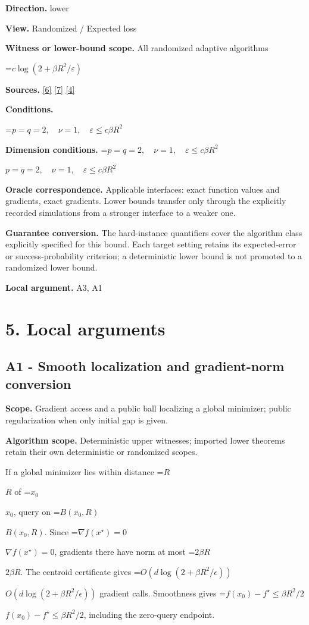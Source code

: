 \documentclass[10pt,a4paper]{article}
\newcommand{\AtlasMath}[1]{\par\begingroup\centering\setbox0=\hbox{$\displaystyle #1$}\ifdim\wd0>1.4\linewidth\typeout{ATLAS WIDE FORMULA: \the\wd0}\fi\ifdim\wd0>\linewidth\resizebox{\linewidth}{!}{\box0}\else\box0\fi\par\endgroup}
\newcommand{\AtlasInlineMath}[1]{\begingroup\setbox0=\hbox{$#1$}\ifdim\wd0>.4\linewidth\endgroup\AtlasMath{#1}\else\endgroup$#1$\fi}
\begin{document}
\textbf{Direction.} lower

\textbf{View.} Randomized / Expected loss

\textbf{Witness or lower-bound scope.} All randomized adaptive algorithms

\AtlasMath{c\log(2+\beta R^2/\varepsilon)}
\textbf{Sources.} \href{https://arxiv.org/pdf/2101.09740v2}{[6]} \href{https://arxiv.org/pdf/2609.33360v2}{[7]} \href{https://arxiv.org/pdf/2609.10874}{[4]}

\textbf{Conditions.} 
\AtlasMath{p=q=2,\quad\nu=1,\quad\varepsilon\le c\beta R^2}


\textbf{Dimension conditions.} \AtlasInlineMath{p=q=2,\quad\nu=1,\quad\varepsilon\le c\beta R^2}

\textbf{Oracle correspondence.} Applicable interfaces: exact function values and gradients, exact gradients. Lower bounds transfer only through the explicitly recorded simulations from a stronger interface to a weaker one.

\textbf{Guarantee conversion.} The hard-instance quantifiers cover the algorithm class explicitly specified for this bound. Each target setting retains its expected-error or success-probability criterion; a deterministic lower bound is not promoted to a randomized lower bound.

\textbf{Local argument.} A3, A1

\section{5. Local arguments}
\subsection{A1 - Smooth localization and gradient-norm conversion}
\textbf{Scope.} Gradient access and a public ball localizing a global minimizer; public regularization when only initial gap is given.

\textbf{Algorithm scope.} Deterministic upper witnesses; imported lower theorems retain their own deterministic or randomized scopes.

If a global minimizer lies within distance \AtlasInlineMath{R} of \AtlasInlineMath{x_0}, query on \AtlasInlineMath{B(x_0,R)}. Since \AtlasInlineMath{\nabla f(x^\star)=0}, gradients there have norm at most \AtlasInlineMath{2\beta R}. The centroid certificate gives \AtlasInlineMath{O(d\log(2+\beta R^2/\epsilon))} gradient calls. Smoothness gives \AtlasInlineMath{f(x_0)-f^\star\le\beta R^2/2}, including the zero-query endpoint.
\end{document}
